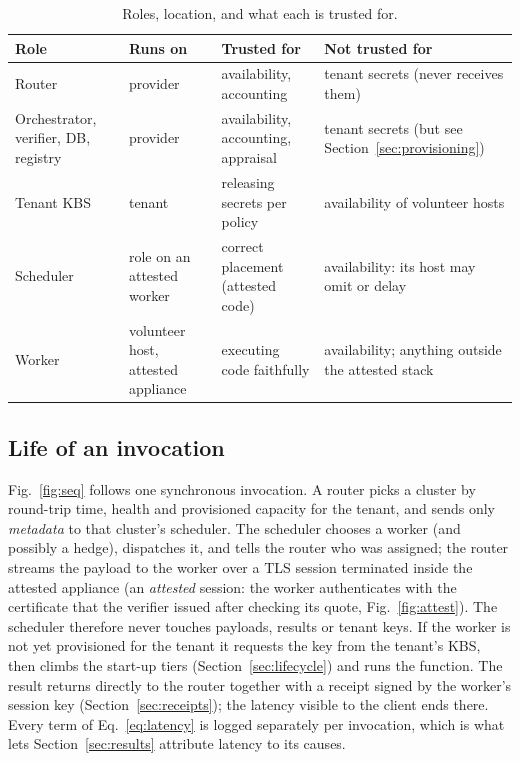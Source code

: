 \begin{table}[t]
\caption{Roles, location, and what each is trusted for.}
\label{tab:roles}
\centering\scriptsize
\setlength{\tabcolsep}{2.5pt}
\begin{tabular}{@{}p{1.55cm}p{1.45cm}p{2.15cm}p{2.7cm}@{}}
\toprule
Role & Runs on & Trusted for & Not trusted for \\
\midrule
Router & provider & availability, accounting & tenant secrets (never receives them) \\
Orchestrator, verifier, DB, registry & provider & availability, accounting, appraisal & tenant secrets (but see Section~\ref{sec:provisioning}) \\
Tenant KBS & tenant & releasing secrets per policy & availability of volunteer hosts \\
Scheduler & role on an attested worker & correct placement (attested code) & availability: its host may omit or delay \\
Worker & volunteer host, attested appliance & executing code faithfully & availability; anything outside the attested stack \\
\bottomrule
\end{tabular}
\end{table}

\subsection{Life of an invocation}
Fig.~\ref{fig:seq} follows one synchronous invocation. A router picks a cluster by round-trip time, health and provisioned
capacity for the tenant, and sends only \emph{metadata} to that cluster's scheduler. The scheduler chooses a worker (and possibly a hedge),
dispatches it, and tells the router who was assigned; the router streams the payload to the worker over a TLS session terminated inside
the attested appliance (an \emph{attested} session: the worker authenticates with the certificate that the verifier issued after checking its quote, Fig.~\ref{fig:attest}). The scheduler therefore never touches payloads, results or tenant keys. If the worker is not yet provisioned for
the tenant it requests the key from the tenant's KBS, then climbs the start-up tiers (Section~\ref{sec:lifecycle}) and runs the function.
The result returns directly to the router together with a receipt signed by the worker's session key (Section~\ref{sec:receipts}); the
latency visible to the client ends there. Every term of Eq.~\eqref{eq:latency} is logged separately per invocation, which is what lets
Section~\ref{sec:results} attribute latency to its causes.

